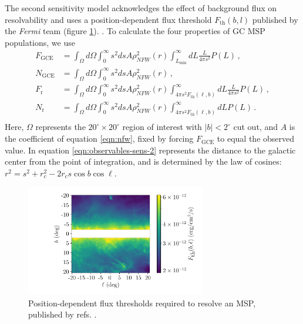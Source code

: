 \documentclass[a4paper,11pt]{article}
\newcommand{\comment}[1]{\emph{\color{red}{#1}}}
\begin{document}
The second sensitivity model acknowledges the effect of background flux on resolvability and uses a position-dependent flux threshold $F_\text{th}(b, l)$ published by the \textit{Fermi} team \cite{Fermi-LAT:2019yla, Ballet:2020hze} (figure \ref{fig:sensitivity}). \comment{Here, I could assess how accurate 1e34 ergs/s actually is. One way would be simply to average over all the pixels in the sensitivity map and convert to luminosity. But isn't it better to weight the average by NFW distribution? In that case, I have to do a line of sight integral too, which means I can no longer use the flux to luminosity ratio in the appendix. It gets complicated...}. To calculate the four properties of GC MSP populations, we use
\begin{equation}
    \begin{split}
        F_\text{GCE} &= \int_\Omega d\Omega \int_0^\infty s^2 ds A \rho_{NFW}^2(r)\int_{L_\text{min}}^\infty dL \frac{L}{4\pi s^2}P(L)\,, \\
        N_\text{GCE} &= \int_\Omega d\Omega \int_0^\infty s^2 ds A \rho_{NFW}^2(r)\,, \\
        F_\text{r} &= \int_\Omega d\Omega \int_0^\infty s^2 ds A \rho_{NFW}^2(r)\int_{4\pi s^2F_\text{th}(\ell, b)}^\infty dL \frac{L}{4\pi s^2}P(L)\,, \\
        N_\text{r} &= \int_\Omega d\Omega \int_0^\infty s^2 ds A \rho_{NFW}^2(r)\int_{4\pi s^2F_\text{th}(\ell, b)}^\infty dL P(L) \,. \\
        \label{eqn:observables-sens-2}
    \end{split}
\end{equation}
Here, $\Omega$ represents the $20^\circ \times 20^\circ$ region of interest with $|b| < 2^\circ$ cut out, and $A$ is the coefficient of equation \ref{eqn:nfw}, fixed by forcing $F_\text{GCE}$ to equal the observed value. In equation \ref{eqn:observables-sens-2} represents the distance to the galactic center from the point of integration, and is determined by the law of cosines: $r^2 = s^2 + r_c^2 - 2r_c s \cos b \cos \ell$.

\begin{figure}
    \centering
    \includegraphics[width=0.7\textwidth]{figs/sensitivity-map.pdf}
    \caption{Position-dependent flux thresholds required to resolve an MSP, published by refs. \cite{Fermi-LAT:2019yla, Ballet:2020hze}. \comment{Maybe I shouldn't show this plot. It's not original; just a display of a FITS file pulled from the 4FGL website. But I could overlay the previous figure of where the 47 point sources are. Would that be useful?}}
    \label{fig:sensitivity}
\end{figure}
\end{document}
